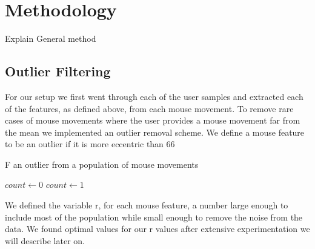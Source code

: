 \documentclass[conference]{IEEEtran}
\begin{document}
\section{Methodology}
Explain General method

\subsection{Outlier Filtering}
For our setup we first went through each of the user samples and extracted each of the features, as defined above, from each mouse movement. To remove rare cases of mouse movements where the user provides a mouse movement far from the mean we implemented an outlier removal scheme. We define a mouse feature to be an outlier if it is more eccentric than 66%

\begin{algorithm}
\caption{F an outlier from a population of mouse movements}\label{euclid}
\begin{algorithmic}[1]
\State $\textit{count} \gets 0$
				\State $count \gets 1$
			\EndIf
		\EndIf
	\EndFor
		\State {}
	\Else
		\State {}
	\EndIf
\EndProcedure
\end{algorithmic}
\end{algorithm}

We defined the variable r, for each mouse feature, a number large enough to include most of the population while small enough to remove the noise from the data. We found optimal values for our r values after extensive experimentation we will describe later on.
\end{document}
